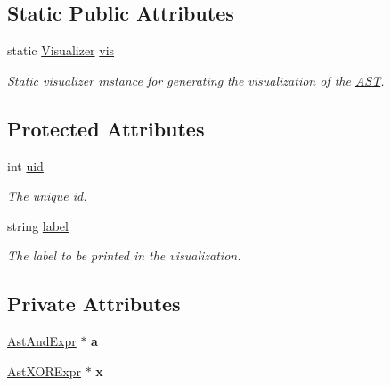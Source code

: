 \subsection*{Static Public Attributes}
\begin{DoxyCompactItemize}
\item 
\hypertarget{classAST_aca9e6637209b31e03a09c0d42f29bdfa}{static \hyperlink{classVisualizer}{Visualizer} \hyperlink{classAST_aca9e6637209b31e03a09c0d42f29bdfa}{vis}}\label{classAST_aca9e6637209b31e03a09c0d42f29bdfa}

\begin{DoxyCompactList}\small\item\em Static visualizer instance for generating the visualization of the \hyperlink{classAST}{A\-S\-T}. \end{DoxyCompactList}\end{DoxyCompactItemize}
\subsection*{Protected Attributes}
\begin{DoxyCompactItemize}
\item 
\hypertarget{classAST_a847b778f1c3dd5a19de32de432ee6e15}{int \hyperlink{classAST_a847b778f1c3dd5a19de32de432ee6e15}{uid}}\label{classAST_a847b778f1c3dd5a19de32de432ee6e15}

\begin{DoxyCompactList}\small\item\em The unique id. \end{DoxyCompactList}\item 
\hypertarget{classAST_ab2e239ccc0688d2341724432ff5a1a31}{string \hyperlink{classAST_ab2e239ccc0688d2341724432ff5a1a31}{label}}\label{classAST_ab2e239ccc0688d2341724432ff5a1a31}

\begin{DoxyCompactList}\small\item\em The label to be printed in the visualization. \end{DoxyCompactList}\end{DoxyCompactItemize}
\subsection*{Private Attributes}
\begin{DoxyCompactItemize}
\item 
\hypertarget{classAstXORExpr_a7026a65e57b3ae26d8b7cf8547fc17f9}{\hyperlink{classAstAndExpr}{Ast\-And\-Expr} $\ast$ {\bfseries a}}\label{classAstXORExpr_a7026a65e57b3ae26d8b7cf8547fc17f9}

\item 
\hypertarget{classAstXORExpr_aae414bcc43b3bfc11df5aca902df486f}{\hyperlink{classAstXORExpr}{Ast\-X\-O\-R\-Expr} $\ast$ {\bfseries x}}\label{classAstXORExpr_aae414bcc43b3bfc11df5aca902df486f}

\end{DoxyCompactItemize}


